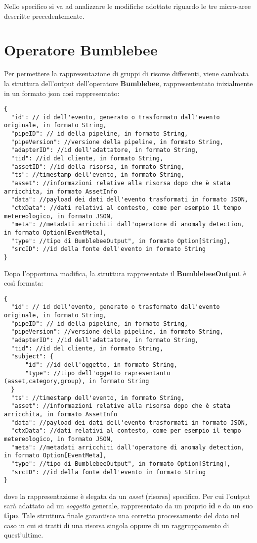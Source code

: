 Nello specifico si va ad analizzare le modifiche adottate riguardo le tre micro-aree descritte precedentemente.

\section{Operatore Bumblebee}\label{sec:bbout}
Per permettere la rappresentazione di gruppi di risorse differenti, viene cambiata la struttura dell'output dell'operatore \textbf{Bumblebee}, rappresententato inizialmente in un formato \gls{json} così rappresentato:

\begin{verbatim}
{
  "id": // id dell'evento, generato o trasformato dall'evento originale, in formato String,
  "pipeID": // id della pipeline, in formato String,
  "pipeVersion": //versione della pipeline, in formato String,
  "adapterID": //id dell'adattatore, in formato String,
  "tid": //id del cliente, in formato String,
  "assetID": //id della risorsa, in formato String,
  "ts": //timestamp dell'evento, in formato String,
  "asset": //informazioni relative alla risorsa dopo che è stata arricchita, in formato AssetInfo
  "data": //payload dei dati dell'evento trasformati in formato JSON,
  "ctxData": //dati relativi al contesto, come per esempio il tempo metereologico, in formato JSON,
  "meta": //metadati arricchiti dall'operatore di anomaly detection, in formato Option[EventMeta],
  "type": //tipo di BumblebeeOutput", in formato Option[String],
  "srcID": //id della fonte dell'evento in formato String
}
\end{verbatim}

Dopo l'opportuna modifica, la struttura rappresentate il \textbf{BumblebeeOutput} è così formata:

\begin{verbatim}
{
  "id": // id dell'evento, generato o trasformato dall'evento originale, in formato String,
  "pipeID": // id della pipeline, in formato String,
  "pipeVersion": //versione della pipeline, in formato String,
  "adapterID": //id dell'adattatore, in formato String,
  "tid": //id del cliente, in formato String,
  "subject": {
	  "id": //id dell'oggetto, in formato String,
	  "type": //tipo dell'oggetto rapresentanto (asset,category,group), in formato String
  }
  "ts": //timestamp dell'evento, in formato String,
  "asset": //informazioni relative alla risorsa dopo che è stata arricchita, in formato AssetInfo
  "data": //payload dei dati dell'evento trasformati in formato JSON,
  "ctxData": //dati relativi al contesto, come per esempio il tempo metereologico, in formato JSON,
  "meta": //metadati arricchiti dall'operatore di anomaly detection, in formato Option[EventMeta],
  "type": //tipo di BumblebeeOutput", in formato Option[String],
  "srcID": //id della fonte dell'evento in formato String
}
\end{verbatim}
dove la rappresentazione è slegata da un \textit{asset} (risorsa) specifico. Per cui l'output sarà adattato ad un \textit{soggetto} generale, rappresentato da un proprio \textbf{id} e da un suo \textbf{tipo}.
Tale struttura finale garantisce una corretto processamento del dato nel caso in cui si tratti di una risorsa singola oppure di un raggruppamento di quest'ultime.

